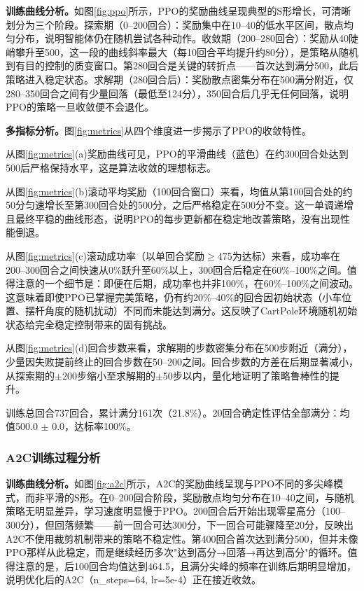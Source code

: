 \documentclass[12pt,a4paper]{ctexart}
\begin{document}
\textbf{训练曲线分析。}如图\ref{fig:ppo}所示，PPO的奖励曲线呈现典型的S形增长，可清晰划分为三个阶段。探索期（0--200回合）：奖励集中在10--40的低水平区间，散点均匀分布，说明智能体仍在随机尝试各种动作。收敛期（200--280回合）：奖励从40陡峭攀升至500，这一段的曲线斜率最大（每10回合平均提升约80分），是策略从随机到有目的控制的质变窗口。第280回合是关键的转折点——首次达到满分500，此后策略进入稳定状态。求解期（280回合后）：奖励散点密集分布在500满分附近，仅280--350回合之间有少量回落（最低至124分），350回合后几乎无任何回落，说明PPO的策略一旦收敛便不会退化。

\textbf{多指标分析。}图\ref{fig:metrics}从四个维度进一步揭示了PPO的收敛特性。

从图\ref{fig:metrics}(a)奖励曲线可见，PPO的平滑曲线（蓝色）在约300回合处达到500后严格保持水平，这是算法收敛的理想标志。

从图\ref{fig:metrics}(b)滚动平均奖励（100回合窗口）来看，均值从第100回合处的约50分匀速增长至第300回合处的500分，之后严格稳定在500分不变。这一单调递增且最终平稳的曲线形态，说明PPO的每步更新都在稳定地改善策略，没有出现性能倒退。

从图\ref{fig:metrics}(c)滚动成功率（以单回合奖励$\geq$475为达标）来看，成功率在200--300回合之间快速从0\%跃升至60\%以上，300回合后稳定在60\%--100\%之间。值得注意的一个细节是：即便在后期，成功率也并非100\%，在60\%--100\%之间波动。这意味着即使PPO已掌握完美策略，仍有约20\%--40\%的回合因初始状态（小车位置、摆杆角度的随机扰动）不同而未能达到满分。这反映了CartPole环境随机初始状态给完全稳定控制带来的固有挑战。

从图\ref{fig:metrics}(d)回合步数来看，求解期的步数密集分布在500步附近（满分），少量因失败提前终止的回合步数在50--200之间。回合步数的方差在后期显著减小，从探索期的$\pm$200步缩小至求解期的$\pm$50步以内，量化地证明了策略鲁棒性的提升。

训练总回合737回合，累计满分161次（21.8\%）。20回合确定性评估全部满分：均值500.0 $\pm$ 0.0，达标率100\%。

\subsubsection{A2C训练过程分析}

\textbf{训练曲线分析。}如图\ref{fig:a2c}所示，A2C的奖励曲线呈现与PPO不同的多尖峰模式，而非平滑的S形。在0--200回合阶段，奖励散点均匀分布在10--40之间，与随机策略无明显差异，学习速度明显慢于PPO。200回合后开始出现零星高分（100--300分），但回落频繁——前一回合可达300分，下一回合可能骤降至20分，反映出A2C不使用裁剪机制带来的策略不稳定性。第400回合首次达到满分500，但并未像PPO那样从此稳定，而是继续经历多次"达到高分→回落→再达到高分"的循环。值得注意的是，后100回合均值达到464.5，且满分尖峰的频率在训练后期明显增加，说明优化后的A2C（n\_steps=64, lr=5e-4）正在接近收敛。
\end{document}
